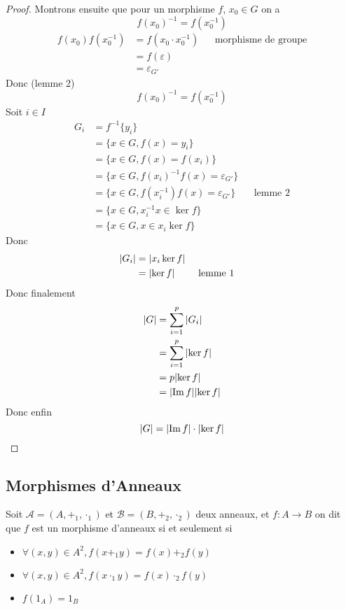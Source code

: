 \documentclass[11pt,colorlinks]{book}
\theoremstyle{mytheoremstyle}
\theoremstyle{mytheoremstyle}
\theoremstyle{mytheoremstyle}
\theoremstyle{mytheoremstyle}
\theoremstyle{mytheoremstyle}
\theoremstyle{mytheoremstyle}
\theoremstyle{mytheoremstyle}
\theoremstyle{mytheoremstyle}
\theoremstyle{myproblemstyle}
\begin{document}
\begin{theorem}
\begin{proof}
    Montrons ensuite que pour un morphisme $f$, $x_0 \in G$ on a 
    \begin{equation*}
      f(x_0)^{-1} = f(x_0^{-1})
    \end{equation*}
    \begin{align*}
      f(x_0)f(x_0^{-1}) &= f(x_0\cdot x_0^{-1}) && \text{morphisme de groupe} \\ 
      &= f(\varepsilon) \\ 
      &= \varepsilon_{G'}
    \end{align*}
    Donc (lemme 2)
    \begin{equation*}
      f(x_0)^{-1} = f(x_0^{-1})
    \end{equation*}
    Soit $i \in I$
    \begin{align*}
      G_i &= f^{-1}\{y_i\} \\ 
      &= \{x \in G, f(x) = y_i\} \\ 
      &= \{x \in G, f(x) = f(x_i)\} \\ 
      &= \{x \in G, f(x_i)^{-1}f(x) = \varepsilon_{G'}\} \\ 
      &= \{x \in G, f(x_i^{-1})f(x) = \varepsilon_{G'}\} && \text{lemme 2}\\ 
      &= \{x \in G, x_i^{-1}x \in \ker f\} \\ 
      &= \{x \in G, x \in x_i\ker f\}
    \end{align*}
    Donc 
    \begin{align*}
      \abs{G_i} &= \abs{x_i\ker f} \\ 
      &= \abs{\ker f} && \text{lemme 1}
    \end{align*}
    Donc finalement 
    \begin{align*}
      \abs{G} &= \sum_{i=1}^p \abs{G_i} \\ 
      &= \sum_{i=1}^p \abs{\ker f} \\ 
      &= p\abs{\ker f} \\ 
      &= \abs{\Im f}\abs{\ker f}
    \end{align*}
    Donc enfin 
    \begin{equation*}
      \abs{G} = \abs{\Im f} \cdot \abs{\ker f}
    \end{equation*}
  \end{proof}

\end{theorem}
\subsection{Morphismes d'Anneaux}
\begin{definition}
  Soit $\mathcal A = (A,+_1,\cdot_1)$ et $\mathcal B = (B,+_2,\cdot_2)$ deux anneaux, et $f : A \to B$ on dit que $f$ est un morphisme 
  d'anneaux si et seulement si 
  \begin{itemize}
    \item $\forall (x,y) \in A^2, f(x +_1 y) = f(x) +_2 f(y)$
    \item $\forall (x,y) \in A^2, f(x \cdot_1 y) = f(x) \cdot_2 f(y)$
    \item $f(1_A) = 1_B$
  \end{itemize}
\end{definition}
\end{document}
